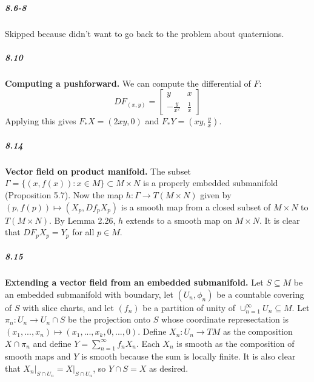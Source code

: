 \documentclass[10pt,letter]{article}
\begin{document}
\subparagraph{8.6-8} Skipped because didn't want to go back to the problem about quaternions.  

\subparagraph{8.10} {\bf Computing a pushforward.} We can compute the differential of $F$:
\[
 DF_{(x,y)} =  
\begin{bmatrix}
y & x \\
-\frac{y}{x^2} & \frac{1}{x}
\end{bmatrix}  
\]
Applying this gives $F_{\ast}X = (2xy,0)$ and $F_{\ast}Y = (xy,\frac{y}{x})$. 

\subparagraph{8.14} {\bf Vector field on product manifold.} The subset $\Gamma = \lbrace (x,f(x)): x \in M \rbrace \subset M \times N$ is a properly embedded submanifold (Proposition 5.7). Now the map $h: \Gamma \rightarrow T(M \times N)$ given by $(p,f(p)) \mapsto (X_p,Df_pX_p)$ is a smooth map from a closed subset of $M \times N$ to $T(M \times N)$. By Lemma 2.26, $h$ extends to a smooth map on $M \times N$. It is clear that $DF_pX_p = Y_p$ for all $p \in M$. 

\subparagraph{8.15} {\bf Extending a vector field from an embedded submanifold.} Let $S \subseteq M$ be an embedded submanifold with boundary, let $(U_n,\phi_n)$ be a countable covering of $S$ with slice charts, and let $(f_n)$ be a partition of unity of $\cup_{n=1}^\infty U_n \subseteq M$. Let $\pi_n: U_n \rightarrow U_n \cap S$ be the projection onto $S$ whose coordinate represectation is $(x_1,...,x_n) \mapsto (x_1,...,x_k,0,...,0)$. Define $X_n: U_n \rightarrow TM$ as the composition $X \cap \pi_n$ and define $Y = \sum_{n = 1}^\infty f_n X_n$. Each $X_n$ is smooth as the composition of smooth maps and $Y$ is smooth because the sum is locally finite. It is also clear that $X_n \vert_{S \cap U_n} = X \vert_{S \cap U_n}$, so $Y \cap S = X$ as desired. 
\end{document}
